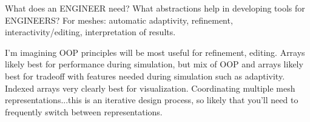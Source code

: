 \documentclass[12pt]{article}
\begin{document}
What does an ENGINEER need? What abstractions help in developing tools for ENGINEERS? For meshes: automatic adaptivity, refinement, interactivity/editing, interpretation of results.

I'm imagining OOP principles will be most useful for refinement, editing.  Arrays likely best for performance during simulation, but mix of OOP and arrays likely best for tradeoff with features needed during simulation such as adaptivity.  Indexed arrays very clearly best for visualization.  Coordinating multiple mesh representations...this is an iterative design process, so likely that you'll need to frequently switch between representations.


{}
\end{document}
